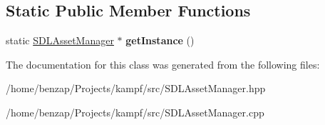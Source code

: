 \subsection*{Static Public Member Functions}
\begin{DoxyCompactItemize}
\item 
\hypertarget{classSDLAssetManager_af98b7900a8962817c4ae8d660d4641d0}{static \hyperlink{classSDLAssetManager}{S\-D\-L\-Asset\-Manager} $\ast$ {\bfseries get\-Instance} ()}\label{classSDLAssetManager_af98b7900a8962817c4ae8d660d4641d0}

\end{DoxyCompactItemize}


The documentation for this class was generated from the following files\-:\begin{DoxyCompactItemize}
\item 
/home/benzap/\-Projects/kampf/src/S\-D\-L\-Asset\-Manager.\-hpp\item 
/home/benzap/\-Projects/kampf/src/S\-D\-L\-Asset\-Manager.\-cpp\end{DoxyCompactItemize}
